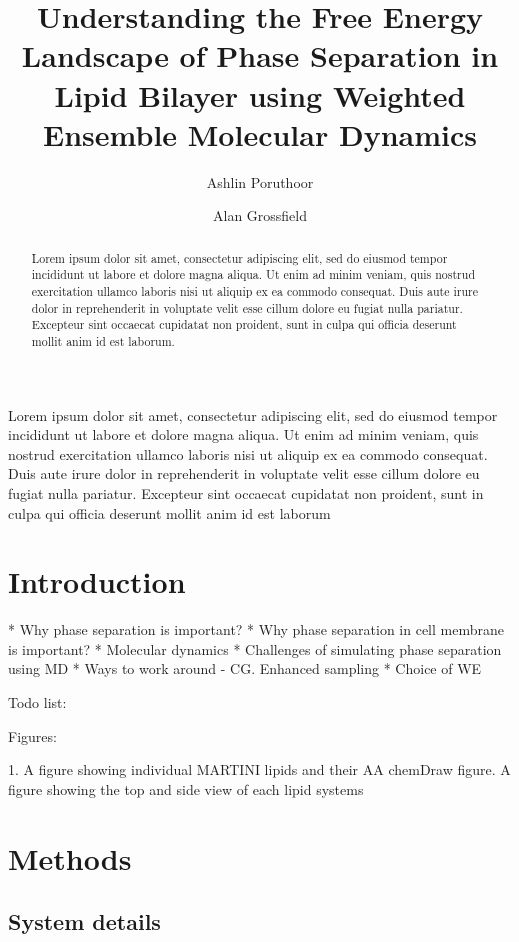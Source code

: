\documentclass{biophys-new}
\title{Understanding the Free Energy Landscape of Phase Separation in Lipid Bilayer using Weighted Ensemble Molecular Dynamics}
\author[1]{Ashlin Poruthoor}
\author[1,*]{Alan Grossfield}
\affil[1]{University of Rochester Medical Center, Rochester, NY 14620}
\begin{document}
\begin{frontmatter}
\begin{abstract}

Lorem ipsum dolor sit amet, consectetur adipiscing elit, sed do eiusmod tempor incididunt ut labore et dolore magna aliqua. Ut enim ad minim veniam, quis nostrud exercitation ullamco laboris nisi ut aliquip ex ea commodo consequat. Duis aute irure dolor in reprehenderit in voluptate velit esse cillum dolore eu fugiat nulla pariatur. Excepteur sint occaecat cupidatat non proident, sunt in culpa qui officia deserunt mollit anim id est laborum.

\end{abstract}

\begin{sigstatement}

Lorem ipsum dolor sit amet, consectetur adipiscing elit, sed do eiusmod tempor incididunt ut labore et dolore magna aliqua. Ut enim ad minim veniam, quis nostrud exercitation ullamco laboris nisi ut aliquip ex ea commodo consequat. Duis aute irure dolor in reprehenderit in voluptate velit esse cillum dolore eu fugiat nulla pariatur. Excepteur sint occaecat cupidatat non proident, sunt in culpa qui officia deserunt mollit anim id est laborum

\end{sigstatement}

\end{frontmatter}

\section*{Introduction}

* Why phase separation is important?
* Why phase separation in cell membrane is important?
* Molecular dynamics
* Challenges of simulating phase separation using MD
* Ways to work around - CG. Enhanced sampling 
* Choice of WE

Todo list:

Figures: 

1. A figure showing individual MARTINI lipids and their AA chemDraw figure.
    A figure showing the top and side view of each lipid systems

\section*{Methods}

\subsection*{System details}
\end{document}
